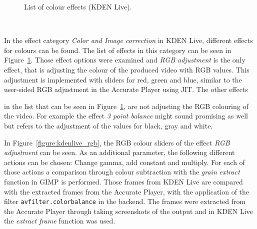 \documentclass[../MasterThesis.tex]{subfiles}
\begin{document}
\begin{minipage}{0.48\textwidth}
	\vspace*{-0.3em}
	\begin{figure}[H]
	\begin{center}
		\caption[List of colour effects in KDEN Live.]{List of colour effects (KDEN Live).}
		\label{figure:kdenlive_effekte}
	\end{center}
	\end{figure}
	\vfill
	
	
\end{minipage}\begin{minipage}{0.04\textwidth}
	\ 
\end{minipage}\begin{minipage}{0.48\textwidth}
%
%
In the effect category \textit{Color and Image correction} in KDEN Live, different effects for colours can be found. The list of effects in this category can be seen in Figure~\ref{figure:kdenlive_effekte}. 
Those effect options were examined and \textit{RGB adjustment} is the only effect, that is adjusting the colour of the produced video with RGB values. This adjustment is implemented with sliders for red, green and blue, similar to the user-sided RGB adjustment in the Accurate Player using JIT. The other effects

\end{minipage}


in the list that can be seen in Figure~\ref{figure:kdenlive_effekte}, are not adjusting the RGB colouring of the video.
For example the effect \textit{3 point balance} might sound promising as well but refers to the adjustment of the values for black, gray and white.


In Figure~\ref{figure:kdenlive_rgb}, the RGB colour sliders of the effect \textit{RGB adjustment} can be seen. As an additional parameter, the following different actions can be chosen: Change gamma, add constant and multiply. For each of those actions a comparison through colour subtraction with the \textit{grain extract} function in GIMP is performed. Those frames from KDEN Live are compared with the extracted frames from the Accurate Player, with the application of the filter \texttt{avfilter.colorbalance} in the backend.
The frames were extracted from the Accurate Player through taking screenshots of the output and in KDEN Live the \textit{extract frame} function was used.
\end{document}
